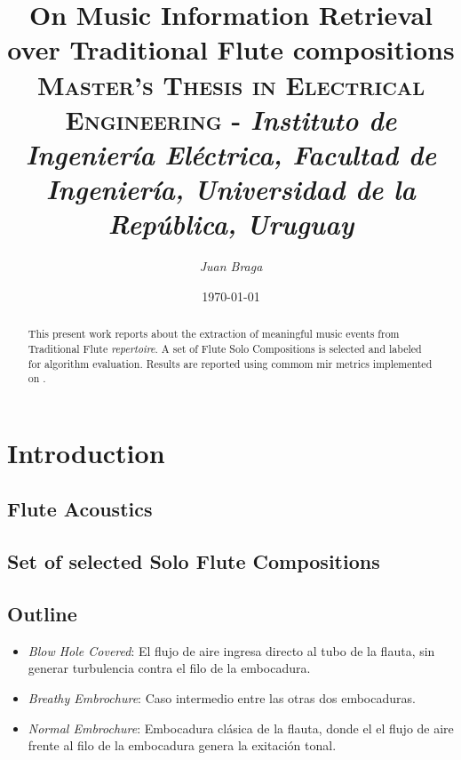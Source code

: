 \documentclass{article}
\title{\textbf{On Music Information Retrieval over Traditional Flute compositions}\\\large \textsc{Master's Thesis in Electrical Engineering} - \textit{Instituto de Ingeniería Eléctrica, Facultad de Ingeniería, Universidad de la República, Uruguay}}
\author{\textit{Juan Braga}}
\date{\today}
\begin{document}
\maketitle 
\begin{abstract}
This present work reports about the extraction of meaningful music events from Traditional Flute \textit{repertoire}. A set of Flute Solo Compositions is selected and labeled for algorithm evaluation. Results are reported using commom mir metrics implemented on \cite{raffel2014mir_eval}.
\end{abstract}


\section{Introduction}

\subsection{Flute Acoustics}

\subsection{Set of selected Solo Flute Compositions}

\subsection{Outline}

\begin{itemize} 
  \item \textit{Blow Hole Covered}: El flujo de aire ingresa directo al tubo de la flauta, sin generar turbulencia contra el filo de la embocadura. 
  \item \textit{Breathy Embrochure}: Caso intermedio entre las otras dos embocaduras. 
  \item \textit{Normal Embrochure}: Embocadura clásica de la flauta, donde el el flujo de aire frente al filo de la embocadura genera la exitación tonal.
\end{itemize}
\medskip
\end{document}
